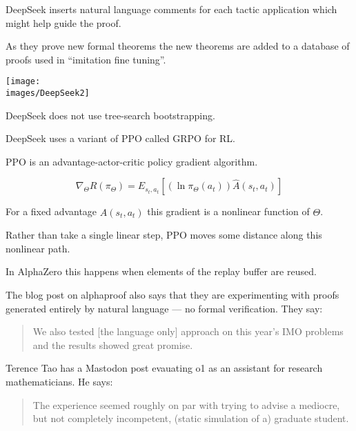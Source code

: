 {\vfill
DeepSeek inserts natural language comments for each tactic application which might help guide the proof.


As they prove new formal theorems the new theorems are added to a database of proofs
used in ``imitation fine tuning''.

\vfill
\centerline{\texttt{[image: \\images/DeepSeek2]}}

\vfill
DeepSeek does not use tree-search bootstrapping.


DeepSeek uses a variant of PPO called GRPO for RL.

\vfill
PPO is an advantage-actor-critic policy gradient algorithm.

$$\nabla_\Theta R(\pi_\Theta) = E_{s_t,a_t}\left[(\ln \pi_\Theta(a_t)) \hat{A}(s_t,a_t)\right]$$

\vfill
For a fixed advantage $\hat{A}(s_t,a_t)$ this gradient is a nonlinear function of $\Theta$.

\vfill
Rather than take a single linear step, PPO moves some distance along this nonlinear path.

\vfill
In AlphaZero this happens when elements of the replay buffer are reused.


The blog post on alphaproof also says that they are experimenting with proofs generated entirely by natural language --- no formal verification.  They say:

\vfill

\begin{quotation}
We also tested [the language only] approach on this year’s IMO problems and the results showed great promise.
\end{quotation}


Terence Tao has a Mastodon post evauating o1 as an assistant for research mathematicians. He says:

\vfill
\begin{quotation}
The experience seemed roughly on par with trying to advise a mediocre, but not completely incompetent, (static simulation of a) graduate student.
\end{quotation}


}
